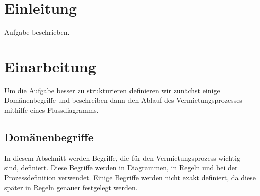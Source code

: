



\setcounter{secnumdepth}{3}
\setcounter{tocdepth}{2}

\pagestyle{empty}


\tableofcontents
\setcounter{page}{1}

\pagestyle{scrheadings}

\newpage

\section{Einleitung}

Aufgabe beschrieben.

\section{Einarbeitung}

Um die Aufgabe besser zu strukturieren definieren wir zunächst einige Domänenbegriffe und 
beschreiben dann den Ablauf des Vermietungsprozesses mithilfe eines Flussdiagramms.

\subsection{Domänenbegriffe}

In diesem Abschnitt werden Begriffe, die für den Vermietungsprozess wichtig sind, definiert.
Diese Begriffe werden in Diagrammen, in Regeln und bei der Prozessdefinition verwendet.
Einige Begriffe werden nicht exakt definiert, da diese später in Regeln genauer
festgelegt werden.

